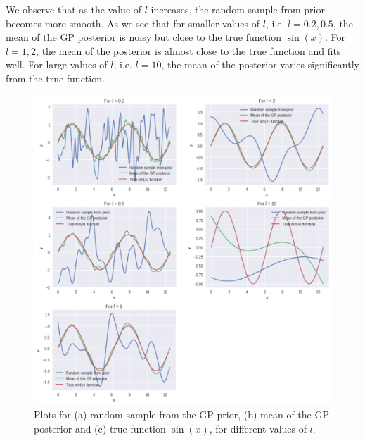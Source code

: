 \documentclass[a4paper,11pt]{article}
\begin{document}
\begin{pmisolution}
We observe that as the value of $l$ increases, the random sample from prior becomes more smooth. As we see that for smaller values of $l$, i.e. $l =0.2, 0.5$, the mean of the GP posterior is noisy but close to the true function $\sin(x)$. For $l=1,2$, the mean of the posterior is almost close to the true function and fits well. For large values of $l$, i.e. $l=10$, the mean of the posterior varies significantly from the true function. 
\begin{figure}
    \centering
    \includegraphics[width=\linewidth]{"Q4_2.pdf"}
    \caption{Plots for (a) random sample from the GP prior, (b) mean of the GP posterior and (c) true function $\sin(x)$, for different values of $l$.}
    \label{fig:plt}
\end{figure}
\end{pmisolution}
\end{document}
